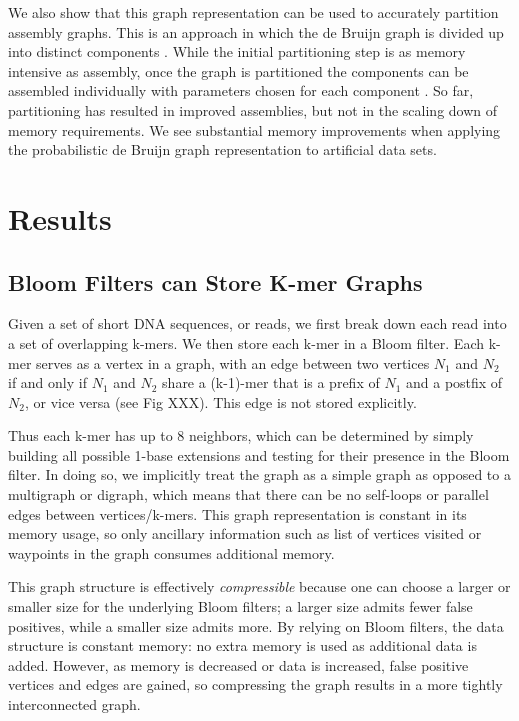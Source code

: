 \documentclass[12pt]{article} \usepackage{simplemargins}
\begin{document}
We also show that this graph representation can be used to accurately
partition assembly graphs.  This is an approach in which the de Bruijn
graph is divided up into distinct components \cite{trinity,
  metavelvet,pubmed21685107}.  While the initial partitioning step is
as memory intensive as assembly, once the graph is partitioned the
components can be assembled individually with parameters chosen for
each component \cite{metavelvet,pubmed21685107}.  So far, partitioning
has resulted in improved assemblies, but not in the scaling down
of memory requirements.  We see substantial memory improvements when
applying the probabilistic de Bruijn graph representation to
artificial data sets.


\section{Results}

\subsection{Bloom Filters can Store K-mer Graphs}

Given a set of short DNA sequences, or reads, we first break down each
read into a set of overlapping k-mers.  We then store each k-mer
in a Bloom filter.  Each k-mer serves as a vertex in a graph, with an edge
between two vertices $N_1$ and $N_2$ if and only if $N_1$ and $N_2$
share a (k-1)-mer that is a prefix of $N_1$ and a postfix of $N_2$,
or vice versa (see Fig XXX).  This edge is not stored explicitly.

Thus each k-mer has up to 8 neighbors, which can be determined by
simply building all possible 1-base extensions and testing for their
presence in the Bloom filter.  In doing so, we implicitly treat
the graph as a simple graph as opposed to a multigraph or digraph,
which means that there can be no self-loops or parallel edges between
vertices/k-mers. This graph representation is constant in its memory
usage, so only ancillary information such as list of vertices visited
or waypoints in the graph consumes additional memory.

This graph structure is effectively {\em compressible} because one can
choose a larger or smaller size for the underlying Bloom filters; a
larger size admits fewer false positives, while a smaller size admits
more. By relying on Bloom filters, the data structure is constant
memory: no extra memory is used as additional data is added. However,
as memory is decreased or data is increased, false positive vertices
and edges are gained, so compressing the graph results in a more
tightly interconnected graph.
\end{document}
